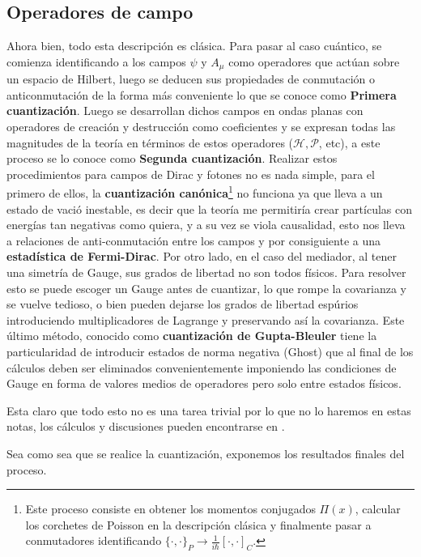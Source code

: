 \documentclass{article}
\numberwithin{equation}{section}
\begin{document}
\subsection{Operadores de campo}\label{sec_campos}
Ahora bien, todo esta descripción es clásica. Para pasar al caso cuántico, se comienza identificando a los campos $ \psi $ y $ A_{\mu} $ como operadores que actúan sobre un espacio de Hilbert, luego se deducen sus propiedades de conmutación o anticonmutación de la forma más conveniente lo que se conoce como \textbf{Primera cuantización}. Luego se desarrollan dichos campos en ondas planas con operadores de creación y destrucción como coeficientes y se expresan todas las magnitudes de la teoría en términos de estos operadores ($ \mathscr{H},\mathscr{P} $, etc), a este proceso se lo conoce como \textbf{Segunda cuantización}. Realizar estos procedimientos para campos de Dirac y fotones no es nada simple, para el primero de ellos, la \textbf{cuantización canónica}\footnote{Este proceso consiste en obtener los momentos conjugados $ \Pi(x) $, calcular los corchetes de Poisson en la descripción clásica y finalmente pasar a conmutadores identificando $ \{\cdot,\cdot\}_{P} \rightarrow \frac{1}{i\hbar} \left[\cdot,\cdot\right]_{C}$.} no funciona ya que lleva a un estado de vació inestable, es decir que la teoría me permitiría crear partículas con energías tan negativas como quiera, y a su vez se viola causalidad, esto nos lleva a relaciones de anti-conmutación entre los campos y por consiguiente a una \textbf{estadística de Fermi-Dirac}. Por otro lado, en el caso del mediador, al tener una simetría de Gauge, sus grados de libertad no son todos físicos. Para resolver esto se puede escoger un Gauge antes de cuantizar, lo que rompe la covarianza y se vuelve tedioso, o bien pueden dejarse los grados de libertad espúrios introduciendo multiplicadores de Lagrange y preservando así la covarianza. Este último método, conocido como \textbf{cuantización de Gupta-Bleuler} tiene la particularidad de introducir estados de norma negativa (Ghost) que al final de los cálculos deben ser eliminados convenientemente imponiendo las condiciones de Gauge en forma de valores medios de operadores pero solo entre estados físicos.

Esta claro que todo esto no es una tarea trivial por lo que no lo haremos en estas notas, los cálculos y discusiones pueden encontrarse en \cite{Itzqui}. 

Sea como sea que se realice la cuantización, exponemos los resultados finales del proceso. 
\end{document}
